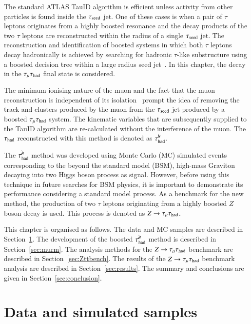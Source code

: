     The standard ATLAS TauID algorithm is efficient unless activity from other particles is found inside the $\tau_\mathrm{seed}$ jet. 
    One of these cases is when a pair of $\tau$ leptons originates from a highly boosted resonance and the decay 
    products of the two $\tau$ leptons are reconstructed within the radius of a single $\tau_\mathrm{seed}$ jet. The 
    reconstruction and identification of boosted systems in which both $\tau$ leptons decay hadronically is 
    achieved by searching for hadronic $\tau\text{-like}$ substructure using a boosted decision tree within 
    a large radius seed jet~\cite{ATLAS-CONF-2020-012}. In this chapter, the decay in the $\tau_\mathrm{\mu}\tau_\mathrm{had}$ final state is considered.

    The minimum ionising nature of the muon and the fact that the muon reconstruction is independent of its isolation~\cite{MUON-2018-03} 
    prompt the idea of removing the track and clusters produced by the muon from the $\tau_\mathrm{seed}$ jet produced by a boosted $\tau_\mathrm{\mu}\tau_\mathrm{had}$ system. The 
    kinematic variables that are subsequently supplied to the TauID algorithm are re-calculated without the interference of 
    the muon. 
    The $\tau_{\text{had}}$ reconstructed with this method is denoted as $\tau_\mathrm{had}^{\mu\mkern-10mu\backslash}$.

    The $\tau_\mathrm{had}^{\mu\mkern-10mu\backslash}$ method was developed using Monte Carlo (MC) simulated events corresponding to the beyond the standard model (BSM), 
    high-mass Graviton~\cite{Graviton_theory} decaying into two Higgs boson process as signal. However, before using this technique in future searches for 
    BSM physics, it is important to demonstrate its performance considering a standard model process. As a benchmark 
    for the new method, the production of two $\tau$ leptons originating from a highly boosted $Z$ boson decay is used. This process is 
    denoted as $Z\rightarrow\tau_\mathrm{\mu}\tau_{\text{had}}$.\
    
    This chapter is organised as follows. 
    The data and MC samples are described in Section~\ref{sec:DataAndMCs}. 
    The development of the boosted $\tau_\mathrm{had}^{\mu\mkern-10mu\backslash}$ method is described in Section~\ref{sec:murm}. 
    The analysis methods for the $Z\rightarrow\tau_\mathrm{\mu}\tau_{\text{had}}$ benchmark are described in Section~\ref{sec:Zttbench}. 
    The results of the $Z\rightarrow\tau_\mathrm{\mu}\tau_{\text{had}}$ benchmark analysis are described in Section~\ref{sec:results}. 
    The summary and conclusions are given in Section~\ref{sec:conclusion}.



\section{Data and simulated samples} \label{sec:DataAndMCs}

